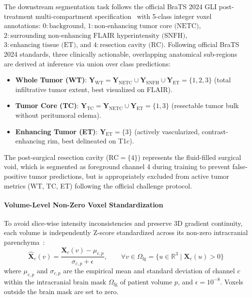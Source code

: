 \documentclass{article}
\begin{document}
The downstream segmentation task follows the official BraTS 2024 GLI post-treatment multi-compartment specification~\citep{brats2024} with 5-class integer voxel annotations: $0:\text{background}$, $1:\text{non-enhancing tumor core (NETC)}$, $2:\text{surrounding non-enhancing FLAIR hyperintensity (SNFH)}$, $3:\text{enhancing tissue (ET)}$, and $4:\text{resection cavity (RC)}$. Following official BraTS 2024 standards, three clinically actionable, overlapping anatomical sub-regions are derived at inference via union over class predictions:
\begin{itemize}
    \item \textbf{Whole Tumor (WT)}: $\mathbf{Y}_{\text{WT}} = \mathbf{Y}_{\text{NETC}} \cup \mathbf{Y}_{\text{SNFH}} \cup \mathbf{Y}_{\text{ET}} = \{1, 2, 3\}$ (total infiltrative tumor extent, best visualized on FLAIR).
    \item \textbf{Tumor Core (TC)}: $\mathbf{Y}_{\text{TC}} = \mathbf{Y}_{\text{NETC}} \cup \mathbf{Y}_{\text{ET}} = \{1, 3\}$ (resectable tumor bulk without peritumoral edema).
    \item \textbf{Enhancing Tumor (ET)}: $\mathbf{Y}_{\text{ET}} = \{3\}$ (actively vascularized, contrast-enhancing rim, best delineated on T1c).
\end{itemize}
The post-surgical resection cavity ($\text{RC} = \{4\}$) represents the fluid-filled surgical void, which is segmented as foreground channel 4 during training to prevent false-positive tumor predictions, but is appropriately excluded from active tumor metrics (WT, TC, ET) following the official challenge protocol.

\paragraph{Volume-Level Non-Zero Voxel Standardization}
To avoid slice-wise intensity inconsistencies and preserve 3D gradient continuity, each volume is independently Z-score standardized across its non-zero intracranial parenchyma~\citep{menze2014multimodal,bakas2018identifying,isensee2021nnunet}:
\begin{equation}
    \hat{\mathbf{X}}_{c}(v) = \frac{\mathbf{X}_c(v) - \mu_{c, p}}{\sigma_{c, p} + \epsilon}, \qquad \forall v \in \Omega_{\text{fg}} = \{u \in \mathbb{R}^3 \mid \mathbf{X}_c(u) > 0\}
\end{equation}
where $\mu_{c, p}$ and $\sigma_{c, p}$ are the empirical mean and standard deviation of channel $c$ within the intracranial brain mask $\Omega_{\text{fg}}$ of patient volume $p$, and $\epsilon = 10^{-8}$. Voxels outside the brain mask are set to zero.
\end{document}
